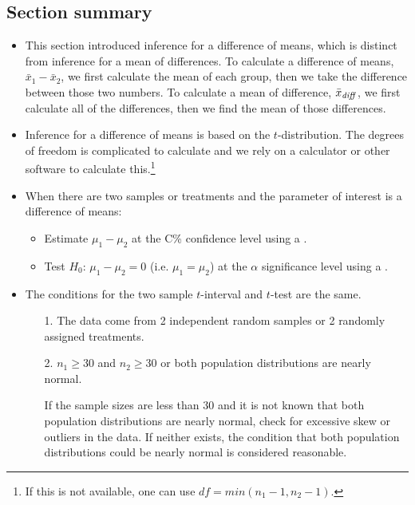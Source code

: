\subsection*{Section summary}
\begin{itemize} 
\item This section introduced inference for a difference of means, which is distinct from inference for a mean of differences.  To calculate a difference of means, $\bar{x}_1-\bar{x}_2$, we first calculate the mean of each group, then we take the difference between those two numbers.  To calculate a mean of difference, $\bar{x}_{\text{\emph{diff}}}$, we first calculate all of the differences, then we find the mean of those differences.  
\item Inference for a difference of means is based on the $t$-distribution.  The degrees of freedom is complicated to calculate and we rely on a calculator or other software to calculate this.\footnote{If this is not available, one can use $df=min(n_1-1, n_2-1)$.}

\item When there are two samples or treatments and the parameter of interest is a difference of means:  
\begin{itemize}\vspace{-1mm}
\setlength{\itemsep}{0mm}
\item Estimate $\mu_1-\mu_2$ at the C\% confidence level using a .
\item Test $H_0$: $\mu_1-\mu_2=0$ (i.e. $\mu_1=\mu_2$) at the $\alpha$ significance level using a  .
\end{itemize}

\item The conditions for the two sample $t$-interval and $t$-test are the same.  
\begin{itemize}
\item[1.] The data come from 2 independent random samples or 2 randomly assigned treatments.
\item[2.] $n_1\ge 30$ and $n_2\ge 30$ or both population distributions are nearly normal.
\item[]  If the sample sizes are less than 30 and it is not known that both population distributions are nearly normal, check for excessive skew or outliers in the data.  If neither exists, the condition that both population distributions could be nearly normal is considered reasonable.
\end{itemize}




\end{itemize}
